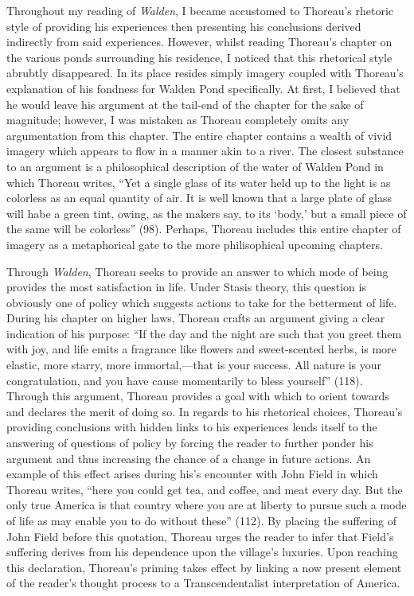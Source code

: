 \documentclass[12pt]{article}
\newcommand{\tq}[2]{
    \fancyhead[L]{\emph{Walden}: Reading Journals}
    \fancyhead[R]{TQ:\ #1 $\vert$ CH: #2}
}
\begin{document}
Throughout my reading of \emph{Walden}, I became accustomed to Thoreau's rhetoric style of providing his experiences then presenting his conclusions derived indirectly from said experiences. However, whilst reading Thoreau's chapter on the various ponds surrounding his residence, I noticed that this rhetorical style abrubtly disappeared. In its place resides simply imagery coupled with Thoreau's explanation of his fondness for Walden Pond specifically. At first, I believed that he would leave his argument at the tail-end of the chapter for the sake of magnitude; however, I was mistaken as Thoreau completely omits any argumentation from this chapter. The entire chapter contains a wealth of vivid imagery which appears to flow in a manner akin to a river. The closest substance to an argument is a philosophical description of the water of Walden Pond in which Thoreau writes, ``Yet a single glass of its water held up to the light is as colorless as an equal quantity of air. It is well known that a large plate of glass will habe a green tint, owing, as the makers say, to its `body,' but a small piece of the same will be colorless'' (98). Perhaps, Thoreau includes this entire chapter of imagery as a metaphorical gate to the more philisophical upcoming chapters.

\newpage
\tq{TBD}{10 \& 11 - Baker Farm and Higher Laws}


Through \emph{Walden}, Thoreau seeks to provide an answer to which mode of being provides the most satisfaction in life. Under Stasis theory, this question is obviously one of policy which suggests actions to take for the betterment of life. During his chapter on higher laws, Thoreau crafts an argument giving a clear indication of his purpose: ``If the day and the night are such that you greet them with joy, and life emits a fragrance like flowers and sweet-scented herbs, is more elastic, more starry, more immortal,—that is your success. All nature is your congratulation, and you have cause momentarily to bless yourself'' (118). Through this argument, Thoreau provides a goal with which to orient towards and declares the merit of doing so. In regards to his rhetorical choices, Thoreau's providing conclusions with hidden links to his experiences lends itself to the answering of questions of policy by forcing the reader to further ponder his argument and thus increasing the chance of a change in future actions. An example of this effect arises during his's encounter with John Field in which Thoreau writes, ``here you could get tea, and coffee, and meat every day. But the only true America is that country where you are at liberty to pursue such a mode of life as may enable you to do without these'' (112). By placing the suffering of John Field before this quotation, Thoreau urges the reader to infer that Field's suffering derives from his dependence upon the village's luxuries. Upon reaching this declaration, Thoreau's priming takes effect by linking a now present element of the reader's thought process to a Transcendentalist interpretation of America.
\end{document}
